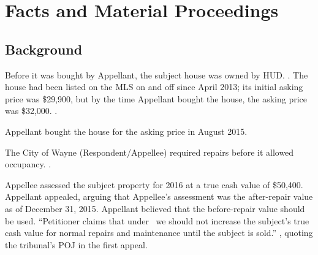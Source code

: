 \documentclass[12pt,\documentclassflag]{michiganCourtOfAppealsBrief}
\begin{document}



\section{Facts and Material Proceedings}
\label{facts}

\subsection{Background}

Before it was bought by Appellant, the subject house was owned by HUD.
\mlsListing[]. 
The house had been listed on the MLS on and off since April 2013;
its initial asking price was \$29,900,
but by the time Appellant bought the house, the asking price was \$32,000. \mlsHistory[].


Appellant bought the house for the asking price in August 2015. 

The City of Wayne (Respondent/Appellee) required repairs before it allowed occupancy. %
\repairs.

Appellee assessed the subject property for 2016 at a true cash value of \$50,400. Appellant appealed, arguing that Appellee's assessment was the after-repair value as of December 31, 2015.
Appellant believed that the before-repair value should be used. 
``Petitioner claims that under \mathieuGast\ we should not increase the subject's true cash value for normal repairs and maintenance until the subject is sold.'' , quoting the tribunal's POJ in the first appeal.
\end{document}
